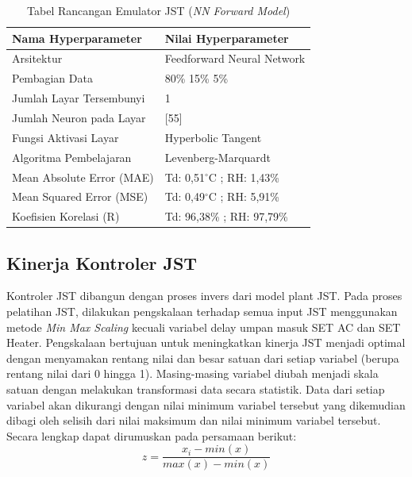 \begin{table}[!hbt]
	\caption{Tabel Rancangan Emulator JST (\textit{NN Forward Model})}
	\label{tbl:5:NNEmulator}
	\centering
	\begin{tabular}{|p{5.7cm}|p{5cm}|}
		\hline
		\textbf{Nama Hyperparameter} & \textbf{Nilai Hyperparameter} \\ \hline
		Arsitektur & Feedforward Neural Network \\ \hline
		Pembagian Data & 80\% 15\% 5\% \\ \hline 
		Jumlah Layar Tersembunyi & 1 \\ \hline
		Jumlah Neuron pada Layar & [55] \\ \hline
		Fungsi Aktivasi Layar & Hyperbolic Tangent \\ \hline
		Algoritma Pembelajaran & Levenberg-Marquardt \\ \hline
		Mean Absolute Error (MAE) & Td: 0,51$^\circ$C ; RH: 1,43\% \\ \hline
		Mean Squared Error (MSE) & Td: 0,49$^\circ$C ; RH: 5,91\% \\ \hline
		Koefisien Korelasi (R) & Td: 96,38\% ; RH: 97,79\% \\ \hline
	\end{tabular}
\end{table}

\subsection{Kinerja Kontroler JST}

Kontroler JST dibangun dengan proses invers dari model plant JST. Pada proses pelatihan JST, dilakukan pengskalaan terhadap semua input JST menggunakan metode \textit{Min Max Scaling} kecuali variabel delay umpan masuk SET AC dan SET Heater. Pengskalaan bertujuan untuk meningkatkan kinerja JST menjadi optimal dengan menyamakan rentang nilai dan besar satuan dari setiap variabel (berupa rentang nilai dari 0 hingga 1). Masing-masing variabel diubah menjadi skala satuan dengan melakukan transformasi data secara statistik. Data dari setiap variabel akan dikurangi dengan nilai minimum variabel tersebut yang dikemudian dibagi oleh selisih dari nilai maksimum dan nilai minimum variabel tersebut. Secara lengkap dapat dirumuskan pada persamaan berikut:
\begin{equation} \label{eq:5:MinMaxScaler}
z = \frac{x_i - min(x)}{max(x) - min(x)}
\end{equation}

